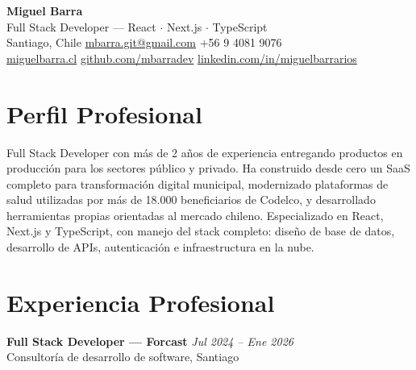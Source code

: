 \documentclass[10.5pt]{article}
\begin{document}
\begin{center}
  {\LARGE\bfseries Miguel Barra}\\[3pt]
  {\large Full Stack Developer --- React $\cdot$ Next.js $\cdot$ TypeScript}\\[5pt]
  Santiago, Chile\enspace\textbullet\enspace
  \href{mailto:mbarra.git@gmail.com}{mbarra.git@gmail.com}\enspace\textbullet\enspace
  +56 9 4081 9076\\[2pt]
  \href{https://miguelbarra.cl}{miguelbarra.cl}\enspace\textbullet\enspace
  \href{https://github.com/mbarradev}{github.com/mbarradev}\enspace\textbullet\enspace
  \href{https://www.linkedin.com/in/miguelbarrarios}{linkedin.com/in/miguelbarrarios}
\end{center}

\vspace{2pt}

\section{Perfil Profesional}

Full Stack Developer con más de 2 años de experiencia entregando productos en producción para los sectores público y privado. Ha construido desde cero un SaaS completo para transformación digital municipal, modernizado plataformas de salud utilizadas por más de 18.000 beneficiarios de Codelco, y desarrollado herramientas propias orientadas al mercado chileno. Especializado en React, Next.js y TypeScript, con manejo del stack completo: diseño de base de datos, desarrollo de APIs, autenticación e infraestructura en la nube.

\vspace{4pt}

\section{Experiencia Profesional}

\textbf{Full Stack Developer --- Forcast} \hfill \textit{Jul 2024 -- Ene 2026}\\
{\small Consultoría de desarrollo de software, Santiago}
\end{document}
